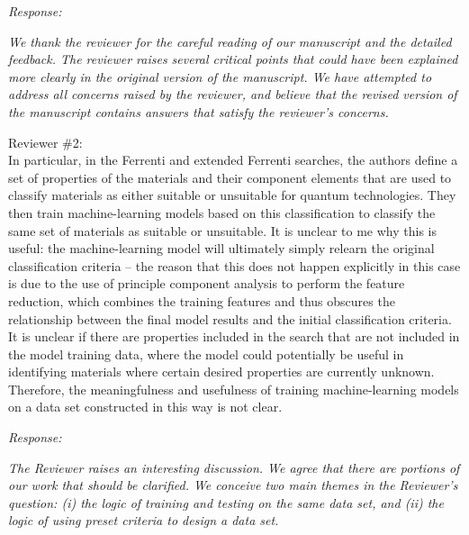 \documentclass[11pt, a4paper]{letter} %
\begin{document}
\textit{Response:}  

\textit{We thank the reviewer for the careful reading of our manuscript and the detailed feedback. The reviewer raises several critical points that could have been explained more clearly in the original version of the manuscript. We have attempted to address all concerns raised by the reviewer, and believe that the revised version of the manuscript contains answers that satisfy the reviewer’s concerns. } 

Reviewer \#2: \\
In particular, in the Ferrenti and extended Ferrenti searches, the authors define a set of properties of the materials and their component elements that are used to classify materials as either suitable or unsuitable for quantum technologies. They then train machine-learning models based on this classification to classify the same set of materials as suitable or unsuitable. It is unclear to me why this is useful: the machine-learning model will ultimately simply relearn the original classification criteria – the reason that this does not happen explicitly in this case is due to the use of principle component analysis to perform the feature reduction, which combines the training features and thus obscures the relationship between the final model results and the initial classification criteria. It is unclear if there are properties included in the search that are not included in the model training data, where the model could potentially be useful in identifying materials
where certain desired properties are currently unknown. Therefore, the meaningfulness and usefulness of training machine-learning models on a data set constructed in this way is not clear.

\textit{Response:} 


\textit{The Reviewer raises an interesting discussion. We agree that there are portions of our work that should be clarified. We conceive two main themes in the Reviewer's question: (i) the logic of training and testing on the same data set, and (ii) the logic of using preset criteria to design a data set.} 
\end{document}

